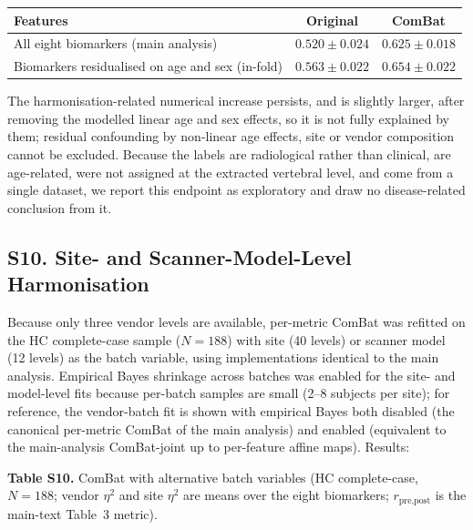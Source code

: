 \documentclass[12pt,a4paper]{article}
\begin{document}
\begin{table}[H]
\centering
\footnotesize
\begin{tabular}{lcc}
\toprule
\textbf{Features} & \textbf{Original} & \textbf{ComBat} \\
\midrule
All eight biomarkers (main analysis) & $0.520\pm0.024$ & $0.625\pm0.018$ \\
Biomarkers residualised on age and sex (in-fold) & $0.563\pm0.022$ & $0.654\pm0.022$ \\
\bottomrule
\end{tabular}
\end{table}

The harmonisation-related numerical increase persists, and is slightly larger, after removing the modelled linear age and sex effects, so it is not fully explained by them; residual confounding by non-linear age effects, site or vendor composition cannot be excluded. Because the labels are radiological rather than clinical, are age-related, were not assigned at the extracted vertebral level, and come from a single dataset, we report this endpoint as exploratory and draw no disease-related conclusion from it.

\subsection*{S10. Site- and Scanner-Model-Level Harmonisation}

Because only three vendor levels are available, per-metric ComBat was refitted on the HC complete-case sample ($N=188$) with site (40 levels) or scanner model (12 levels) as the batch variable, using implementations identical to the main analysis. Empirical Bayes shrinkage across batches was enabled for the site- and model-level fits because per-batch samples are small (2--8 subjects per site); for reference, the vendor-batch fit is shown with empirical Bayes both disabled (the canonical per-metric ComBat of the main analysis) and enabled (equivalent to the main-analysis ComBat-joint up to per-feature affine maps). Results:

\textbf{Table S10.} ComBat with alternative batch variables (HC complete-case, $N=188$; vendor $\eta^2$ and site $\eta^2$ are means over the eight biomarkers; $r_{\text{pre,post}}$ is the main-text Table~3 metric).
\end{document}
